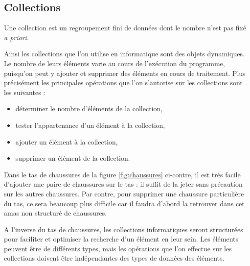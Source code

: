 \subsection{Collections}\label{sub:collections}

\begin{defin}
Une collection est un regroupement fini de données dont le nombre n'est pas fixé {\em a priori}.
\end{defin}

Ainsi les collections que l'on utilise en informatique sont des objets dynamiques. 
Le nombre de leurs éléments varie au cours de l'exécution du programme, 
puisqu'on peut y ajouter et supprimer des éléments en cours de traitement. 
Plus précisément les principales opérations que l'on s'autorise sur les collections 
sont les suivantes :  
\begin{itemize}
\item déterminer le nombre d'éléments de la collection,
\item tester l'appartenance d'un élément à la collection,
\item ajouter un élément à la collection,
\item supprimer un élément de la collection.
\end{itemize}

\begin{ex}\label{ex:chaussures}
Dans le tas de chaussures de la figure \ref{fig:chaussures} ci-contre, il est très facile 
d'ajouter une paire de chaussures sur le tas : il suffit de la jeter sans précaution
sur les autres chaussures. Par contre, pour supprimer une chaussure
particulière du tas, ce sera beaucoup plus difficile car il faudra d'abord la retrouver 
dans cet amas non structuré de chaussures.
\end{ex}

A l'inverse du tas de chaussures, les collections informatiques seront structurées 
pour faciliter et optimiser la recherche d'un élément en leur sein.
Les éléments peuvent être de différents types, mais les opérations
que l'on effectue sur les collections doivent être indépendantes 
des types de données des éléments.

